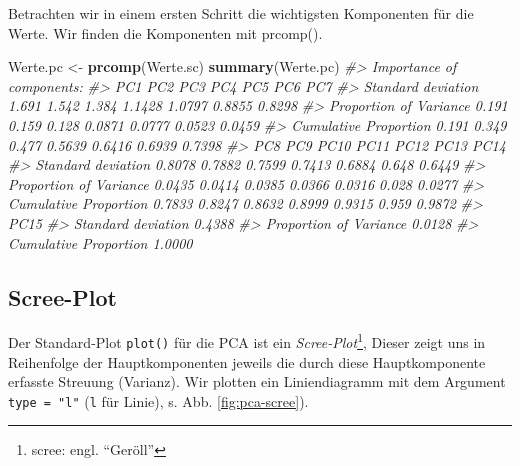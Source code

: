 \documentclass[12pt,ngerman,]{book}
\makeatletter
\newenvironment{Shaded}{\begin{snugshade}}{\end{snugshade}}
\newcommand{\KeywordTok}[1]{\textcolor[rgb]{0.13,0.29,0.53}{\textbf{{#1}}}}
\newcommand{\DecValTok}[1]{\textcolor[rgb]{0.00,0.00,0.81}{{#1}}}
\newcommand{\StringTok}[1]{\textcolor[rgb]{0.31,0.60,0.02}{{#1}}}
\newcommand{\CommentTok}[1]{\textcolor[rgb]{0.56,0.35,0.01}{\textit{{#1}}}}
\newcommand{\NormalTok}[1]{{#1}}
\let\rmarkdownfootnote\footnote%
\def\footnote{\protect\rmarkdownfootnote}
\newenvironment{kframe}{%
\medskip{}
\setlength{\fboxsep}{.8em}
 \def\at@end@of@kframe{}%
 \ifinner\ifhmode%
  \def\at@end@of@kframe{\end{minipage}}%
  \begin{minipage}{\columnwidth}%
 \fi\fi%
 \def\FrameCommand##1{\hskip\@totalleftmargin \hskip-\fboxsep
 \colorbox{shadecolor}{##1}\hskip-\fboxsep
     \hskip-\linewidth \hskip-\@totalleftmargin \hskip\columnwidth}%
 \MakeFramed {\advance\hsize-\width
   \@totalleftmargin\z@ \linewidth\hsize
   \@setminipage}}%
 {\par\unskip\endMakeFramed%
 \at@end@of@kframe}
\renewenvironment{Shaded}{\begin{kframe}}{\end{kframe}}
\makeatother
\begin{document}
Betrachten wir in einem ersten Schritt die wichtigsten Komponenten für
die Werte. Wir finden die Komponenten mit prcomp().

\begin{Shaded}
\begin{Highlighting}[]
\NormalTok{Werte.pc <-}\StringTok{ }\KeywordTok{prcomp}\NormalTok{(Werte.sc)}
\KeywordTok{summary}\NormalTok{(Werte.pc)}
\CommentTok{#> Importance of components:}
\CommentTok{#>                          PC1   PC2   PC3    PC4    PC5    PC6    PC7}
\CommentTok{#> Standard deviation     1.691 1.542 1.384 1.1428 1.0797 0.8855 0.8298}
\CommentTok{#> Proportion of Variance 0.191 0.159 0.128 0.0871 0.0777 0.0523 0.0459}
\CommentTok{#> Cumulative Proportion  0.191 0.349 0.477 0.5639 0.6416 0.6939 0.7398}
\CommentTok{#>                           PC8    PC9   PC10   PC11   PC12  PC13   PC14}
\CommentTok{#> Standard deviation     0.8078 0.7882 0.7599 0.7413 0.6884 0.648 0.6449}
\CommentTok{#> Proportion of Variance 0.0435 0.0414 0.0385 0.0366 0.0316 0.028 0.0277}
\CommentTok{#> Cumulative Proportion  0.7833 0.8247 0.8632 0.8999 0.9315 0.959 0.9872}
\CommentTok{#>                          PC15}
\CommentTok{#> Standard deviation     0.4388}
\CommentTok{#> Proportion of Variance 0.0128}
\CommentTok{#> Cumulative Proportion  1.0000}
\end{Highlighting}
\end{Shaded}

\begin{Shaded}
\end{Shaded}

\subsection{Scree-Plot}\label{scree-plot}

Der Standard-Plot \texttt{plot()} für die PCA ist ein
\emph{Scree-Plot}\footnote{scree: engl. ``Geröll''}, Dieser zeigt uns in
Reihenfolge der Hauptkomponenten jeweils die durch diese Hauptkomponente
erfasste Streuung (Varianz). Wir plotten ein Liniendiagramm mit dem
Argument \texttt{type\ =\ "l"} (\texttt{l} für Linie), s. Abb.
\ref{fig:pca-scree}).
\end{document}
